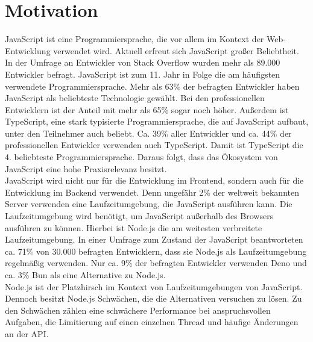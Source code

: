 \pagestyle{fancy-style}

\section{Motivation}
JavaScript ist eine Programmiersprache, die vor allem im Kontext der Web-Entwicklung 
verwendet wird. Aktuell erfreut sich JavaScript großer Beliebtheit. 
In der Umfrage an Entwickler von Stack Overflow wurden mehr als 89.000 Entwickler 
befragt. JavaScript ist zum 11. Jahr in Folge die am häufigsten verwendete Programmiersprache. 
Mehr als 63\% der befragten Entwickler haben JavaScript als beliebteste Technologie 
gewählt. Bei den professionellen Entwicklern ist der Anteil mit mehr als 65\%
sogar noch höher. Außerdem ist TypeScript, eine stark typisierte Programmiersprache, die auf 
JavaScript aufbaut, unter den Teilnehmer auch beliebt. Ca. 39\% aller Entwickler und ca. 44\%
der professionellen Entwickler verwenden auch TypeScript. Damit ist TypeScript die 4. beliebteste 
Programmiersprache. Daraus folgt, dass das Ökosystem von JavaScript eine hohe Praxisrelevanz besitzt. \\

\noindent
JavaScript wird nicht nur für die Entwicklung im Frontend, sondern auch für die Entwicklung im Backend 
verwendet. Denn ungefähr 2\% der weltweit bekannten Server verwenden eine Laufzeitumgebung, die JavaScript 
ausführen kann. Die Laufzeitumgebung wird benötigt, um JavaScript außerhalb des Browsers ausführen zu können.
Hierbei ist Node.js die am weitesten verbreitete Laufzeitumgebung. In einer Umfrage zum Zustand der JavaScript
beantworteten ca. 71\% von 30.000 befragten Entwicklern, dass sie Node.js als Laufzeitumgebung regelmäßig verwenden.
Nur ca. 9\% der befragten Entwickler verwenden Deno und ca. 3\% Bun als eine Alternative zu Node.js. \\

\noindent
Node.js ist der Platzhirsch im Kontext von Laufzeitumgebungen von JavaScript. Dennoch besitzt Node.js Schwächen,
die die Alternativen versuchen zu lösen. Zu den Schwächen zählen eine schwächere Performance bei anspruchsvollen
Aufgaben, die Limitierung auf einen einzelnen Thread und häufige Änderungen an der API.


